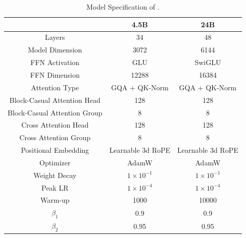 \begin{table}
    \centering
    \small
    \begin{tabular}{c|c|c}
    \toprule
     & 4.5B & 24B \\
    \midrule
    Layers & 34 & 48 \\
    Model Dimension  & 3072  & 6144 \\
    FFN Activation & GLU & SwiGLU \\
    FFN Dimension & 12288 &  16384 \\
    Attention Type & GQA + QK-Norm &  GQA + QK-Norm  \\
    Block-Casual Attention Head & 128 & 128 \\
    Block-Casual Attention Group & 8 & 8\\
    Cross Attention Head & 128 &128\\
    Cross Attention Group & 8 & 8\\
    Positional Embedding & Learnable 3d RoPE & Learnable 3d RoPE  \\
    \midrule
    Optimizer & AdamW & AdamW \\
    Weight Decay & $1 \times 10^{-1}$ & $1 \times 10^{-1}$ \\
    Peak LR & $1 \times 10^{-4}$ & $1 \times 10^{-4}$\\
    Warm-up & 1000 & 10000 \\
    $  \beta_{1}$ & 0.9 & 0.9 \\
    $  \beta_{2}$ & 0.95 & 0.95 \\
    \bottomrule
    \end{tabular}
    \vspace{0.5em}
    \caption{Model Specification of \magi. }
    \label{table:model_specification}
\end{table}
